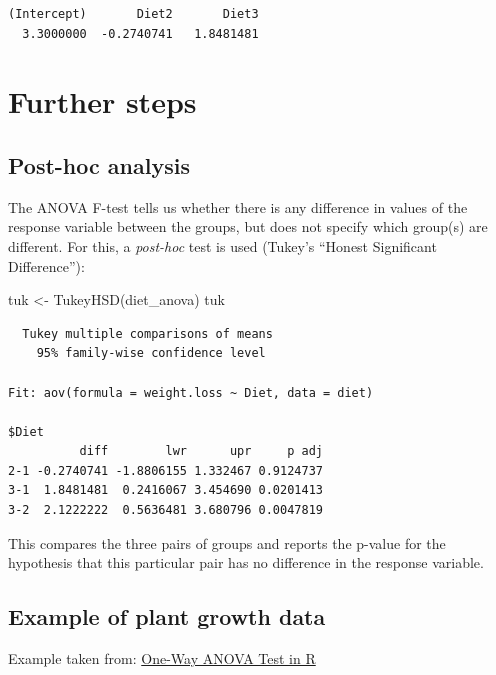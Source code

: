 \documentclass[
  letterpaper,
  DIV=11,
  numbers=noendperiod]{scrreprt}
\newenvironment{Shaded}{\begin{snugshade}}{\end{snugshade}}
\newcommand{\FunctionTok}[1]{\textcolor[rgb]{0.28,0.35,0.67}{#1}}
\newcommand{\NormalTok}[1]{\textcolor[rgb]{0.00,0.23,0.31}{#1}}
\newcommand{\OtherTok}[1]{\textcolor[rgb]{0.00,0.23,0.31}{#1}}
\begin{document}
\begin{verbatim}
(Intercept)       Diet2       Diet3 
  3.3000000  -0.2740741   1.8481481 
\end{verbatim}

\hypertarget{further-steps}{%
\section{Further steps}\label{further-steps}}

\hypertarget{post-hoc-analysis}{%
\subsection{Post-hoc analysis}\label{post-hoc-analysis}}

The ANOVA F-test tells us whether there is any difference in values of
the response variable between the groups, but does not specify which
group(s) are different. For this, a \emph{post-hoc} test is used
(Tukey's ``Honest Significant Difference''):

\begin{Shaded}
\begin{Highlighting}[]
\NormalTok{tuk }\OtherTok{\textless{}{-}} \FunctionTok{TukeyHSD}\NormalTok{(diet\_anova)}
\NormalTok{tuk}
\end{Highlighting}
\end{Shaded}

\begin{verbatim}
  Tukey multiple comparisons of means
    95% family-wise confidence level

Fit: aov(formula = weight.loss ~ Diet, data = diet)

$Diet
          diff        lwr      upr     p adj
2-1 -0.2740741 -1.8806155 1.332467 0.9124737
3-1  1.8481481  0.2416067 3.454690 0.0201413
3-2  2.1222222  0.5636481 3.680796 0.0047819
\end{verbatim}

This compares the three pairs of groups and reports the p-value for the
hypothesis that this particular pair has no difference in the response
variable.

\hypertarget{example-of-plant-growth-data}{%
\subsection{Example of plant growth
data}\label{example-of-plant-growth-data}}

Example taken from:
\href{http://www.sthda.com/english/wiki/one-way-anova-test-in-r}{One-Way
ANOVA Test in R}
\end{document}
